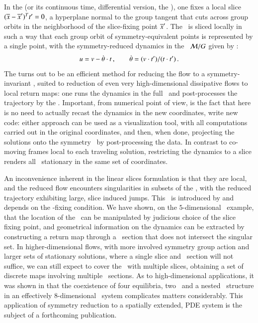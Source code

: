 \documentclass[preprint,number,sort&compress]{elsarticle}
\begin{document}
In the \emph{\mframes} (or its continuous time, differential
version, the \emph{\mslices}), one fixes a local slice
$(\overline{x} - {\overline{x}'} )^T t' =0$, a hyperplane normal
to the group tangent \sliceTan{} that cuts across group
orbits in the neighborhood of the slice-fixing point
${\overline{x}'}$. The \statesp\ is sliced locally in such a way
that each group orbit of symmetry-equivalent points is
represented by a single point, with the symmetry-reduced
dynamics in the \reducedsp\ ${\cal M}/G$ given by
:
\[
u = v - \dot{{\bf \theta}}  \cdot t
    \,,\qquad
\dot{{\bf \theta}} = (v \cdot t')/(t \cdot t')
\,.
\]
The {\mframes}
turns out to be an efficient method for reducing the
flow to a symmetry-in\-vari\-ant \reducedsp, suited to reduction
of {even very high-dimensional}
dissipative flows to local return maps:
one runs the dynamics in the full \statesp\ and
post-processes the trajectory by the \mframes.
Important, from numerical point of  view, is the
fact that here is no need to
actually recast the dynamics in the new coordinates,
write new code: either
approach can be used as a visualization tool, with all
computations carried out in the original coordinates, and
then, when done, projecting the solutions onto the symmetry
\reducedsp\ by post-processing the data.
In contrast to co-moving frames local to each traveling
solution, {restricting the dynamics}
to a slice renders all \reqva\
stationary in the same set of coordinates. 

An inconvenience inherent in the linear slices formulation is that they are
local, and the reduced flow encounters singularities in
subsets of the \reducedsp, with the reduced trajectory exhibiting
large, slice induced jumps.
This \sset\ is introduced by and
depends on the \slice-fixing condition. We have shown,
on the $5$-dimensional \cLe\ example, that the location of
the \sset\ can be manipulated by judicious choice of the slice
fixing point, and geometrical information on the dynamics can
be extracted by constructing a return map through a
\Poincare\ section that does not intersect the singular set.
In higher-dimensional flows, with more involved symmetry
group action and larger sets of stationary solutions, where a
single slice and \Poincare\ section will not suffice, we can
still expect to cover the \reducedsp\ with multiple slices,
obtaining a set of discrete maps involving multiple
\Poincare\ sections. As to high-dimensional applications,
it was shown in  that the coexistence
of four equilibria, two \reqva\ and a nested \fixedsp\
structure in an effectively $8$-dimensional \KS\
system complicates matters considerably. This
application of symmetry reduction to a spatially extended,
PDE system is the
subject of a forthcoming publication\rf{SCD09b}.
\end{document}
